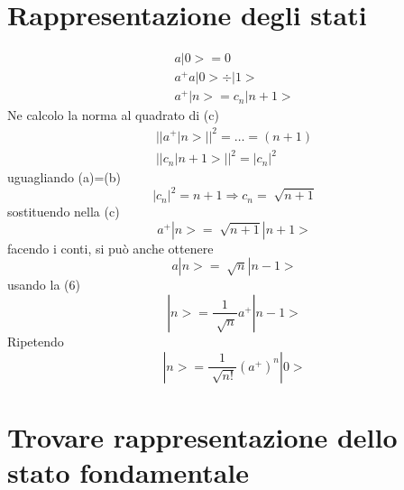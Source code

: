 \section{Rappresentazione degli stati}

\begin{gather*}
    a|0> = 0 \\
    a^+a|0> \div |1> \\
    a^+|n> = c_n |n+1> \tag{c}
\end{gather*}
Ne calcolo la norma al quadrato di (c)
\begin{gather}
        {||a^+|n>||}^2 = \dots = (n+1) \tag{a} \\
        {||c_n|n+1>||}^2 = {|c_n|}^2 \tag{b}
\end{gather}
uguagliando (a)=(b)
\begin{equation*}
    {|c_n|}^2 = n+1 \Rightarrow c_n = \sqrt[]{n+1}
\end{equation*}
sostituendo nella (c)
\begin{equation*}
    a^+|n> = \sqrt[]{n+1} |n+1> \tag{6}
\end{equation*}
facendo i conti, si può anche ottenere
\begin{equation*}
    a|n> = \sqrt[]{n}|n-1> \tag{7}
\end{equation*}
usando la (6)
\begin{equation*}
    |n> = \frac{1}{\sqrt[]{n}}a^+|n-1>
\end{equation*}
Ripetendo 
\begin{equation*}
    |n> = \frac{1}{\sqrt[]{n!}} {(a^+)}^n |0> 
\end{equation*}

\section{Trovare rappresentazione dello stato fondamentale}

